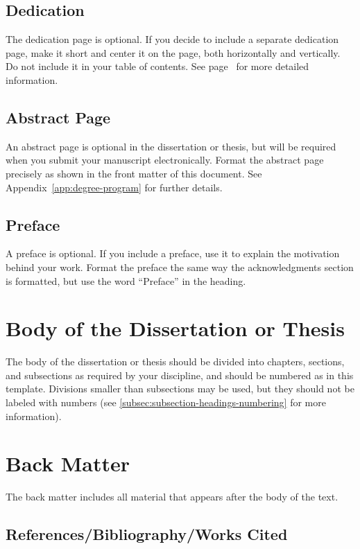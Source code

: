 \subsection{Dedication}

The dedication page is optional.
If you decide to include a separate dedication page, make it short and center it on the page, both horizontally and vertically.
Do not include it in your table of contents.
See page~\pageref{dedication} for more detailed information.

\subsection{Abstract Page}

An abstract page is optional in the dissertation or thesis, but will be required when you submit your manuscript electronically.
Format the abstract page precisely as shown in the front matter of this document.
See Appendix~\ref{app:degree-program} for further details.

\subsection{Preface}

A preface is optional.
If you include a preface, use it to explain the motivation behind your work.
Format the preface the same way the acknowledgments section is formatted, but use the word ``Preface'' in the heading.

\section{Body of the Dissertation or Thesis}

The body of the dissertation or thesis should be divided into chapters, sections, and subsections as required by your discipline, and should be numbered as in this template.
Divisions smaller than subsections may be used, but they should not be labeled with numbers (see \ref{subsec:subsection-headings-numbering} for more information).

\section{Back Matter}

The back matter includes all material that appears after the body of the text.

\subsection{References/Bibliography/Works Cited}

